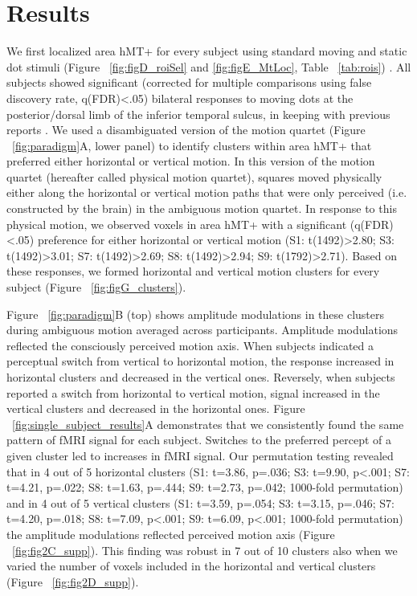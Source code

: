 \section{Results}
We first localized area hMT+ for every subject using standard moving and static dot stimuli (Figure ~\ref{fig:figD_roiSel} and \ref{fig:figE_MtLoc}, Table ~\ref{tab:rois}) \parencite{Huk2002,Emmerling2016}. All subjects showed significant (corrected for multiple comparisons using false discovery rate, q(FDR)\textless.05) bilateral responses to moving dots at the posterior/dorsal limb of the inferior temporal sulcus, in keeping with previous reports \parencite{Huk2002,Kolster2010}. We used a disambiguated version of the motion quartet (Figure ~\ref{fig:paradigm}A, lower panel) to identify clusters within area hMT+ that preferred either horizontal or vertical motion. In this version of the motion quartet (hereafter called physical motion quartet), squares moved physically either along the horizontal or vertical motion paths that were only perceived (i.e. constructed by the brain) in the ambiguous motion quartet. In response to this physical motion, we observed voxels in area hMT+ with a significant (q(FDR) \textless .05) preference for either horizontal or vertical motion (S1: t(1492)\textgreater2.80; S3: t(1492)\textgreater3.01; S7: t(1492)\textgreater2.69; S8: t(1492)\textgreater2.94; S9: t(1792)\textgreater2.71). Based on these responses, we formed horizontal and vertical motion clusters for every subject (Figure ~\ref{fig:figG_clusters}).

Figure ~\ref{fig:paradigm}B (top) shows amplitude modulations in these clusters during ambiguous motion averaged across participants. Amplitude modulations reflected the consciously perceived motion axis. When subjects indicated a perceptual switch from vertical to horizontal motion, the response increased in horizontal clusters and decreased in the vertical ones. Reversely, when subjects reported a switch from horizontal to vertical motion, signal increased in the vertical clusters and decreased in the horizontal ones. Figure ~\ref{fig:single_subject_results}A demonstrates that we consistently found the same pattern of fMRI signal for each subject. Switches to the preferred percept of a given cluster led to increases in fMRI signal. Our permutation testing revealed that in 4 out of 5 horizontal clusters (S1: t=3.86, p=.036; S3: t=9.90, p\textless.001; S7: t=4.21, p=.022; S8: t=1.63, p=.444; S9: t=2.73, p=.042; 1000-fold permutation) and in 4 out of 5 vertical clusters (S1: t=3.59, p=.054; S3: t=3.15, p=.046; S7: t=4.20, p=.018; S8: t=7.09, p\textless.001; S9: t=6.09, p\textless.001; 1000-fold permutation) the amplitude modulations reflected perceived motion axis (Figure ~\ref{fig:fig2C_supp}). This finding was robust in 7 out of 10 clusters also when we varied the number of voxels included in the horizontal and vertical clusters (Figure ~\ref{fig:fig2D_supp}).

